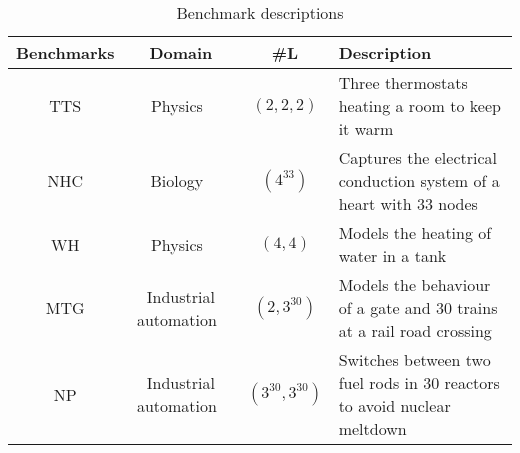 \begin{table*}
	\centering
	\caption{Benchmark descriptions
	\label{tab:benchmarks}}
\begin{tabular}{ | c | c | c | l | } \hline
\textbf{Benchmarks}
	& \textbf{Domain} 
	& \textbf{\#L } 
	& \textbf{Description} \\ \hline

	\acf{TTS}
		& Physics~\cite{Pedro2005}
		& $(2, 2, 2)$
		& Three thermostats heating a room to keep it warm\\ \hline
		
	\acf{NHC}
		& Biology~\cite{chen201487}
		& $(4^{33})$
		& Captures the electrical conduction system of a heart with $33$ nodes\\ \hline

	\acf{WH}
		& Physics~\cite{raskin05}
		& $(4, 4)$
		& Models the heating of water in a tank \\ \hline
		
	\acf{MTG}  
		& Industrial automation~\cite{Costello2013}
		& $(2, 3^{30})$
		& Models the behaviour of a gate and $30$ trains at a rail road crossing\\ \hline
		
	\acf{NP}
		& Industrial automation~\cite{alur2015book}
		& $(3^{30}, 3^{30})$
		& Switches between two fuel rods in 30 reactors to avoid nuclear meltdown\\ \hline
	
	
 \end{tabular}
 \end{table*}
